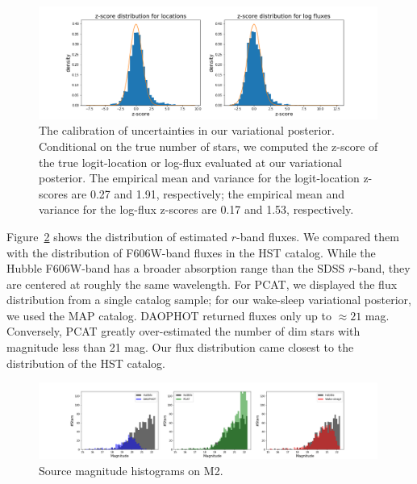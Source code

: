 \begin{figure}[ht]
    \centering
    \includegraphics[width=0.99\textwidth]{figures/z-score_calibration.png}
    \caption{The calibration of uncertainties in our variational posterior. Conditional on the true number of stars, we computed the z-score of the true logit-location or log-flux evaluated at our variational posterior. 
    The empirical mean and variance for the logit-location z-scores are 0.27 and 1.91, respectively; the empirical mean and variance for the log-flux z-scores are 0.17 and 1.53, respectively. 
}
    \label{fig:z-score_calibration}
\end{figure}

Figure~\ref{fig:luminosity_fun_m2} shows the distribution of estimated $r$-band fluxes. We compared them 
with the distribution of F606W-band fluxes in the HST catalog. While the Hubble F606W-band has a broader absorption range than the SDSS $r$-band, they are centered at roughly the same wavelength. For PCAT, we displayed the flux distribution from a single catalog sample; for our wake-sleep variational 
posterior, we used the MAP catalog. DAOPHOT returned fluxes only up to $\approx21$ mag.
Conversely, PCAT greatly over-estimated the number of dim stars with magnitude less than 21 mag. Our flux distribution came closest to the distribution of the HST catalog. 

\begin{figure}[ht]
    \centering
    \includegraphics[width=0.99\textwidth]{figures/luminosity_fun.png}
    \caption{Source magnitude histograms on M2. }
    \label{fig:luminosity_fun_m2}
\end{figure}

